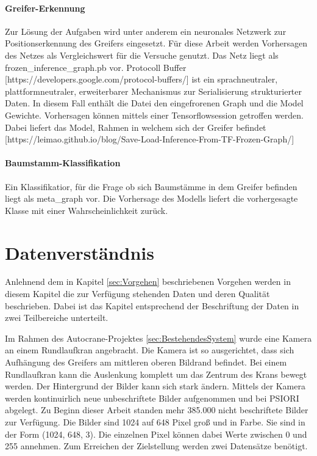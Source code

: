 	\paragraph{Greifer-Erkennung} 
Zur Lösung der Aufgaben wird unter anderem ein neuronales Netzwerk zur Positionserkennung des Greifers eingesetzt. Für diese Arbeit werden Vorhersagen des Netzes als Vergleichswert für die Versuche genutzt. Das Netz liegt als frozen\_inference\_graph.pb vor. Protocoll Buffer  [https://developers.google.com/protocol-buffers/] ist ein sprachneutraler, plattformneutraler, erweiterbarer Mechanismus zur Serialisierung strukturierter Daten. In diesem Fall enthält die Datei den eingefrorenen Graph und die Model Gewichte. Vorhersagen können mittels einer Tensorflowsession getroffen werden. Dabei liefert das Model, Rahmen in welchem sich der Greifer befindet 	[https://leimao.github.io/blog/Save-Load-Inference-From-TF-Frozen-Graph/]
		
	\paragraph{Baumstamm-Klassifikation} 
	Ein Klassifikatior, für die Frage ob sich Baumstämme in dem Greifer befinden liegt als meta\_graph vor. Die Vorhersage des Modells liefert die vorhergesagte Klasse mit einer Wahrscheinlichkeit zurück.

	\section{Datenverständnis}
	\label{sec:DataUnderstanding}
	Anlehnend dem in Kapitel \ref{sec:Vorgehen} beschriebenen Vorgehen  werden in diesem Kapitel die zur Verfügung stehenden Daten und deren Qualität beschrieben. Dabei ist das Kapitel entsprechend der Beschriftung der Daten in zwei Teilbereiche unterteilt.
	
	Im Rahmen des Autocrane-Projektes \ref{sec:BestehendesSystem}  wurde eine Kamera an einem Rundlaufkran angebracht. Die Kamera ist so ausgerichtet, dass sich Aufhängung des Greifers am mittleren oberen Bildrand befindet. Bei einem Rundlaufkran kann die Auslenkung komplett um das Zentrum des Krans bewegt werden. Der Hintergrund der Bilder kann sich stark ändern. Mittels der Kamera werden kontinuirlich neue unbeschriftete Bilder aufgenommen und bei PSIORI abgelegt. Zu Beginn dieser Arbeit standen mehr 385.000 nicht beschriftete Bilder zur Verfügung. Die Bilder sind 1024 auf 648 Pixel groß und in Farbe. Sie sind in der Form (1024, 648, 3). Die einzelnen Pixel können dabei Werte zwischen 0 und 255 annehmen. 
	Zum Erreichen der Zielstellung werden zwei Datensätze benötigt.
	
